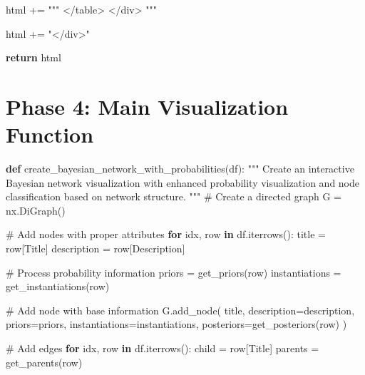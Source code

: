 \documentclass[
  11pt,
  letterpaper,
]{book}
\newenvironment{Shaded}{\begin{snugshade}}{\end{snugshade}}
\newcommand{\CommentTok}[1]{\textcolor[rgb]{0.37,0.37,0.37}{#1}}
\newcommand{\ControlFlowTok}[1]{\textcolor[rgb]{0.00,0.23,0.31}{\textbf{#1}}}
\newcommand{\KeywordTok}[1]{\textcolor[rgb]{0.00,0.23,0.31}{\textbf{#1}}}
\newcommand{\NormalTok}[1]{\textcolor[rgb]{0.00,0.23,0.31}{#1}}
\newcommand{\OperatorTok}[1]{\textcolor[rgb]{0.37,0.37,0.37}{#1}}
\newcommand{\StringTok}[1]{\textcolor[rgb]{0.13,0.47,0.30}{#1}}
\begin{document}
\begin{Shaded}
\begin{Highlighting}[]
\NormalTok{        html }\OperatorTok{+=} \StringTok{"""}
\StringTok{            \textless{}/table\textgreater{}}
\StringTok{        \textless{}/div\textgreater{}}
\StringTok{        """}

\NormalTok{    html }\OperatorTok{+=} \StringTok{"\textless{}/div\textgreater{}"}

    \ControlFlowTok{return}\NormalTok{ html}
\end{Highlighting}
\end{Shaded}

\section{Phase 4: Main Visualization
Function}\label{phase-4-main-visualization-function}

\begin{Shaded}
\begin{Highlighting}[]
\KeywordTok{def}\NormalTok{ create\_bayesian\_network\_with\_probabilities(df):}
    \CommentTok{"""}
\CommentTok{    Create an interactive Bayesian network visualization with enhanced probability visualization}
\CommentTok{    and node classification based on network structure.}
\CommentTok{    """}
    \CommentTok{\# Create a directed graph}
\NormalTok{    G }\OperatorTok{=}\NormalTok{ nx.DiGraph()}

    \CommentTok{\# Add nodes with proper attributes}
    \ControlFlowTok{for}\NormalTok{ idx, row }\KeywordTok{in}\NormalTok{ df.iterrows():}
\NormalTok{        title }\OperatorTok{=}\NormalTok{ row[}\StringTok{\textquotesingle{}Title\textquotesingle{}}\NormalTok{]}
\NormalTok{        description }\OperatorTok{=}\NormalTok{ row[}\StringTok{\textquotesingle{}Description\textquotesingle{}}\NormalTok{]}

        \CommentTok{\# Process probability information}
\NormalTok{        priors }\OperatorTok{=}\NormalTok{ get\_priors(row)}
\NormalTok{        instantiations }\OperatorTok{=}\NormalTok{ get\_instantiations(row)}

        \CommentTok{\# Add node with base information}
\NormalTok{        G.add\_node(}
\NormalTok{            title,}
\NormalTok{            description}\OperatorTok{=}\NormalTok{description,}
\NormalTok{            priors}\OperatorTok{=}\NormalTok{priors,}
\NormalTok{            instantiations}\OperatorTok{=}\NormalTok{instantiations,}
\NormalTok{            posteriors}\OperatorTok{=}\NormalTok{get\_posteriors(row)}
\NormalTok{        )}

    \CommentTok{\# Add edges}
    \ControlFlowTok{for}\NormalTok{ idx, row }\KeywordTok{in}\NormalTok{ df.iterrows():}
\NormalTok{        child }\OperatorTok{=}\NormalTok{ row[}\StringTok{\textquotesingle{}Title\textquotesingle{}}\NormalTok{]}
\NormalTok{        parents }\OperatorTok{=}\NormalTok{ get\_parents(row)}


\end{Highlighting}
\end{Shaded}
\end{document}
